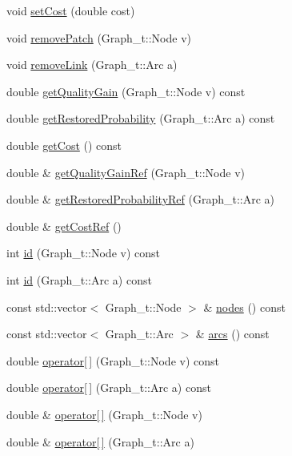 \begin{DoxyCompactItemize}
\item 
void \hyperlink{class_restoration_plan_1_1_option_a279099f3a15244829442c469dea34840}{set\+Cost} (double cost)
\item 
void \hyperlink{class_restoration_plan_1_1_option_a4062a520bf0ded7d03ec6c9b69725c06}{remove\+Patch} (Graph\+\_\+t\+::\+Node v)
\item 
void \hyperlink{class_restoration_plan_1_1_option_ac0f220ea195f37bf169a0cd73352d3cb}{remove\+Link} (Graph\+\_\+t\+::\+Arc a)
\item 
double \hyperlink{class_restoration_plan_1_1_option_a3b6e892cfd36a4612de5222bfcfb23ff}{get\+Quality\+Gain} (Graph\+\_\+t\+::\+Node v) const
\item 
double \hyperlink{class_restoration_plan_1_1_option_a498802305d2c9c421446c326b65a4028}{get\+Restored\+Probability} (Graph\+\_\+t\+::\+Arc a) const
\item 
double \hyperlink{class_restoration_plan_1_1_option_aee4ddb7bdf2b6caaebeb87e2055b5be1}{get\+Cost} () const
\item 
double \& \hyperlink{class_restoration_plan_1_1_option_ab38a032c7b9d0bfdd267e9ec2ff21caa}{get\+Quality\+Gain\+Ref} (Graph\+\_\+t\+::\+Node v)
\item 
double \& \hyperlink{class_restoration_plan_1_1_option_a07ddd47b0851f9470ba6d388f976d877}{get\+Restored\+Probability\+Ref} (Graph\+\_\+t\+::\+Arc a)
\item 
double \& \hyperlink{class_restoration_plan_1_1_option_a614e659b457b722ed61923c2e30f0f8c}{get\+Cost\+Ref} ()
\item 
int \hyperlink{class_restoration_plan_1_1_option_a9f520746b161200657579a6129cbcce4}{id} (Graph\+\_\+t\+::\+Node v) const
\item 
int \hyperlink{class_restoration_plan_1_1_option_a59a89db7f6e5f3fabadb57b89bd71932}{id} (Graph\+\_\+t\+::\+Arc a) const
\item 
const std\+::vector$<$ Graph\+\_\+t\+::\+Node $>$ \& \hyperlink{class_restoration_plan_1_1_option_a61190e5185ad1ccb3e1c4b546fdb02b4}{nodes} () const
\item 
const std\+::vector$<$ Graph\+\_\+t\+::\+Arc $>$ \& \hyperlink{class_restoration_plan_1_1_option_a59cc737c2525fa25f1f1241ea9e53d90}{arcs} () const
\item 
double \hyperlink{class_restoration_plan_1_1_option_a0174047c9abd2e325e5af813eeda3e58}{operator\mbox{[}$\,$\mbox{]}} (Graph\+\_\+t\+::\+Node v) const
\item 
double \hyperlink{class_restoration_plan_1_1_option_a9055a8d1eb192f0e588f20ffd26ed30a}{operator\mbox{[}$\,$\mbox{]}} (Graph\+\_\+t\+::\+Arc a) const
\item 
double \& \hyperlink{class_restoration_plan_1_1_option_a6b8531ca7119295af00743a0f4797dba}{operator\mbox{[}$\,$\mbox{]}} (Graph\+\_\+t\+::\+Node v)
\item 
double \& \hyperlink{class_restoration_plan_1_1_option_a9b78dc0b8b13778ce128f6b723aabdda}{operator\mbox{[}$\,$\mbox{]}} (Graph\+\_\+t\+::\+Arc a)
\end{DoxyCompactItemize}


